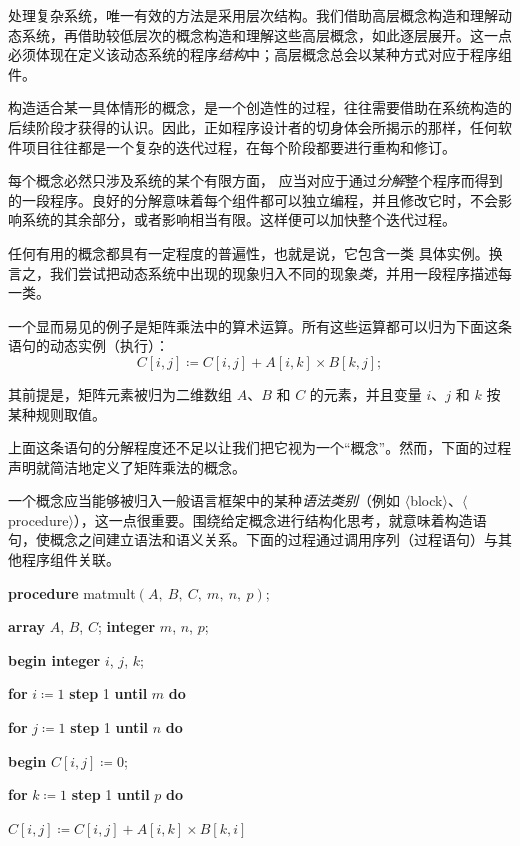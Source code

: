 \documentclass[twoside,11pt,fontset=none]{ctexbook}
\begin{document}
处理复杂系统，唯一有效的方法是采用层次结构。我们借助高层概念构造和理解动态系统，再借助较低层次的概念构造和理解这些高层概念，如此逐层展开。这一点必须体现在定义该动态系统的程序\textit{结构}中；高层概念总会以某种方式对应于程序组件。

构造适合某一具体情形的概念，是一个创造性的过程，往往需要借助在系统构造的后续阶段才获得的认识。因此，正如程序设计者的切身体会所揭示的那样，任何软件项目往往都是一个复杂的迭代过程，在每个阶段都要进行重构和修订。

每个概念必然只涉及系统的某个有限方面，
应当对应于通过\textit{分解}整个程序而得到的一段程序。良好的分解意味着每个组件都可以独立编程，并且修改它时，不会影响系统的其余部分，或者影响相当有限。这样便可以加快整个迭代过程。

任何有用的概念都具有一定程度的普遍性，也就是说，它包含一类
具体实例。换言之，我们尝试把动态系统中出现的现象归入不同的现象\textit{类}，并用一段程序描述每一类。

一个显而易见的例子是矩阵乘法中的算术运算。所有这些运算都可以归为下面这条语句的动态实例（执行）：
$$
C[i, j] \coloneq C[i,j] + A[i, k] \times B[k, j];
$$

\noindent
其前提是，矩阵元素被归为二维数组 $A$、$B$ 和 $C$ 的元素，并且变量 $i$、$j$ 和 $k$ 按某种规则取值。

上面这条语句的分解程度还不足以让我们把它视为一个“概念”。然而，下面的过程声明就简洁地定义了矩阵乘法的概念。

一个概念应当能够被归入一般语言框架中的某种\textit{语法类别}（例如 $\langle$block$\rangle$、$\langle$procedure$\rangle$），这一点很重要。围绕给定概念进行结构化思考，就意味着构造语句，使概念之间建立语法和语义关系。下面的过程通过调用序列（过程语句）与其他程序组件关联。

\quad \textbf{procedure} matmult$(A,\ B,\ C,\ m,\ n,\ p)$;

\quad \quad \textbf{array} $A$, $B$, $C$; \textbf{integer} $m$, $n$, $p$;

\quad \textbf{begin integer} $i$, $j$, $k$;

\quad \quad \textbf{for} $i\coloneq 1$ \textbf{step} 1 \textbf{until} $m$ \textbf{do}

\quad \quad \textbf{for} $j\coloneq 1$ \textbf{step} 1 \textbf{until} $n$ \textbf{do}

\quad \quad \textbf{begin} $C[i, j]\coloneq 0$;

\quad \quad \quad \textbf{for} $k\coloneq 1$ \textbf{step} 1 \textbf{until} $p$ \textbf{do}

\quad \quad \quad \quad $C[i, j]\coloneq C[i, j] + A[i, k] \times B[k, i]$
\end{document}
